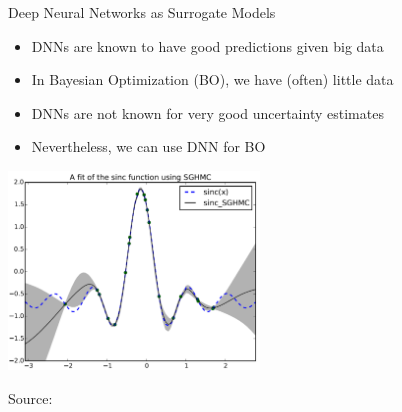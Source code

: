 \begin{frame}[c,fragile]{Deep Neural Networks as Surrogate Models}

\begin{itemize}
	\item DNNs are known to have good predictions given big data
	\item In Bayesian Optimization (BO), we have (often) little data
	\item DNNs are not known for very good uncertainty estimates
	\item Nevertheless, we can use DNN for BO
\end{itemize}

\centering
\includegraphics[width=0.5\textwidth]{images/bo_dnn.png}
\begin{flushright}
	Source: 
\end{flushright}


\end{frame}


